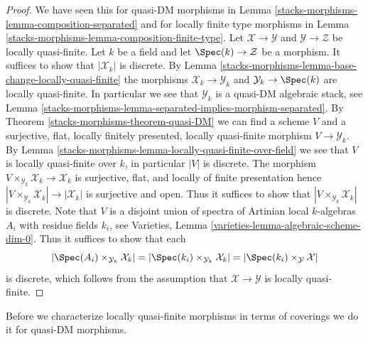 \begin{proof}
We have seen this for quasi-DM morphisms in
Lemma \ref{stacks-morphisms-lemma-composition-separated}
and for locally finite type morphisms in
Lemma \ref{stacks-morphisms-lemma-composition-finite-type}.
Let $\mathcal{X} \to \mathcal{Y}$ and $\mathcal{Y} \to \mathcal{Z}$
be locally quasi-finite. Let $k$ be a field and let
$\Spec(k) \to \mathcal{Z}$ be a morphism.
It suffices to show that $|\mathcal{X}_k|$ is discrete. By
Lemma \ref{stacks-morphisms-lemma-base-change-locally-quasi-finite}
the morphisms $\mathcal{X}_k \to \mathcal{Y}_k$
and $\mathcal{Y}_k \to \Spec(k)$ are locally quasi-finite.
In particular we see that $\mathcal{Y}_k$ is
a quasi-DM algebraic stack, see
Lemma \ref{stacks-morphisms-lemma-separated-implies-morphism-separated}.
By
Theorem \ref{stacks-morphisms-theorem-quasi-DM}
we can find a scheme $V$ and a surjective, flat, locally finitely presented,
locally quasi-finite morphism $V \to \mathcal{Y}_k$. By
Lemma \ref{stacks-morphisms-lemma-locally-quasi-finite-over-field}
we see that $V$ is locally quasi-finite over $k$, in particular
$|V|$ is discrete. The morphism
$V \times_{\mathcal{Y}_k} \mathcal{X}_k \to \mathcal{X}_k$ is
surjective, flat, and locally of finite presentation hence
$|V \times_{\mathcal{Y}_k} \mathcal{X}_k| \to |\mathcal{X}_k|$
is surjective and open. Thus it suffices to show that
$|V \times_{\mathcal{Y}_k} \mathcal{X}_k|$ is discrete.
Note that $V$ is a disjoint union of spectra of Artinian local
$k$-algebras $A_i$ with residue fields $k_i$, see
Varieties, Lemma \ref{varieties-lemma-algebraic-scheme-dim-0}.
Thus it suffices to show that each
$$
|\Spec(A_i) \times_{\mathcal{Y}_k} \mathcal{X}_k| =
|\Spec(k_i) \times_{\mathcal{Y}_k} \mathcal{X}_k| =
|\Spec(k_i) \times_\mathcal{Y} \mathcal{X}|
$$
is discrete, which follows from the assumption that
$\mathcal{X} \to \mathcal{Y}$ is locally quasi-finite.
\end{proof}

Before we characterize locally quasi-finite morphisms in terms of coverings
we do it for quasi-DM morphisms.

